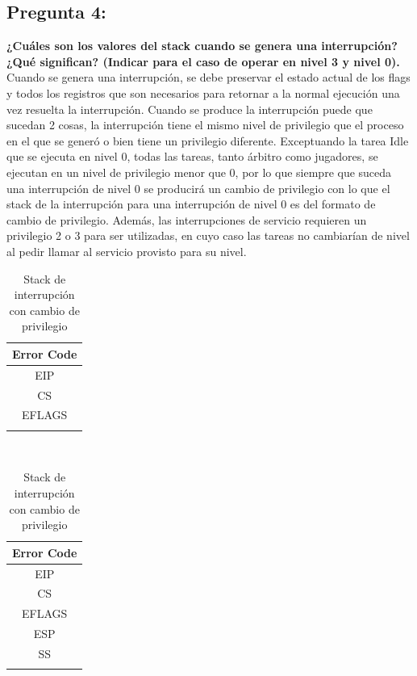 \documentclass[10pt, a4paper]{article}
\begin{document}
{\subsection{Pregunta 4:}} \textbf{¿Cuáles son los valores del stack cuando se genera una interrupción? ¿Qué significan? (Indicar para el caso de operar en nivel 3 y nivel 0).}\newline
\newline
Cuando se genera una interrupción, se debe preservar el estado actual de los flags y todos los registros que son necesarios para retornar a la normal ejecución una vez resuelta la interrupción.
Cuando se produce la interrupción puede que sucedan 2 cosas, la interrupción tiene el mismo nivel de privilegio que el proceso en el que se generó o bien tiene un privilegio diferente. Exceptuando la tarea Idle que se ejecuta en nivel 0, todas las tareas, tanto \'arbitro como jugadores, se ejecutan en un nivel de privilegio menor que 0, por lo que siempre que suceda una interrupción de nivel 0 se producirá un cambio de privilegio con lo que el stack de la interrupción para una interrupción de nivel 0 es del formato de cambio de privilegio. Además, las interrupciones de servicio requieren un privilegio 2 o 3 para ser utilizadas, en cuyo caso las tareas no cambiarían de nivel al pedir llamar al servicio provisto para su nivel.

\begin{table}[h]
	\begin{minipage}{0.7\textwidth}
		\hspace*{0.3\textwidth}
		\begin{tabular}{|c|}
			\\ \hline
			Error Code \\ \hline
			EIP \\ \hline
			CS \\ \hline
			EFLAGS \\ \hline
			\\
		\end{tabular}
		\caption{Stack de interrupción sin cambio de privilegio}
	\end{minipage}
	~
	\begin{minipage}{0.7\textwidth}
		\hspace*{0.3\textwidth}
		\begin{tabular}{|c|}
			\\ \hline
			Error Code \\ \hline
			EIP \\ \hline
			CS \\ \hline
			EFLAGS \\ \hline
			ESP \\ \hline
			SS \\ \hline
			\\
		\end{tabular}
		\caption{Stack de interrupción con cambio de privilegio}
	\end{minipage}
\end{table}
\end{document}
